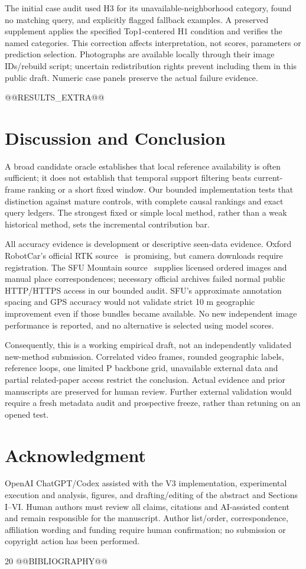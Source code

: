 \documentclass[conference]{IEEEtran}
\begin{document}
The initial case audit used H3 for its unavailable-neighborhood category, found no matching query, and explicitly flagged fallback examples. A preserved supplement applies the specified Top1-centered H1 condition and verifies the named categories. This correction affects interpretation, not scores, parameters or prediction selection. Photographs are available locally through their image IDs/rebuild script; uncertain redistribution rights prevent including them in this public draft. Numeric case panels preserve the actual failure evidence.

@@RESULTS_EXTRA@@

\section{Discussion and Conclusion}
A broad candidate oracle establishes that local reference availability is often sufficient; it does not establish that temporal support filtering beats current-frame ranking or a short fixed window. Our bounded implementation tests that distinction against mature controls, with complete causal rankings and exact query ledgers. The strongest fixed or simple local method, rather than a weak historical method, sets the incremental contribution bar.

All accuracy evidence is development or descriptive seen-data evidence. Oxford RobotCar's official RTK source~\cite{robotcar} is promising, but camera downloads require registration. The SFU Mountain source~\cite{sfu} supplies licensed ordered images and manual place correspondences; necessary official archives failed normal public HTTP/HTTPS access in our bounded audit. SFU's approximate annotation spacing and GPS accuracy would not validate strict 10 m geographic improvement even if those bundles became available. No new independent image performance is reported, and no alternative is selected using model scores.

Consequently, this is a working empirical draft, not an independently validated new-method submission. Correlated video frames, rounded geographic labels, reference loops, one limited P backbone grid, unavailable external data and partial related-paper access restrict the conclusion. Actual evidence and prior manuscripts are preserved for human review. Further external validation would require a fresh metadata audit and prospective freeze, rather than retuning on an opened test.

\section*{Acknowledgment}
OpenAI ChatGPT/Codex assisted with the V3 implementation, experimental execution and analysis, figures, and drafting/editing of the abstract and Sections I--VI. Human authors must review all claims, citations and AI-assisted content and remain responsible for the manuscript. Author list/order, correspondence, affiliation wording and funding require human confirmation; no submission or copyright action has been performed.

\begin{thebibliography}{20}
@@BIBLIOGRAPHY@@
\end{thebibliography}
\end{document}

